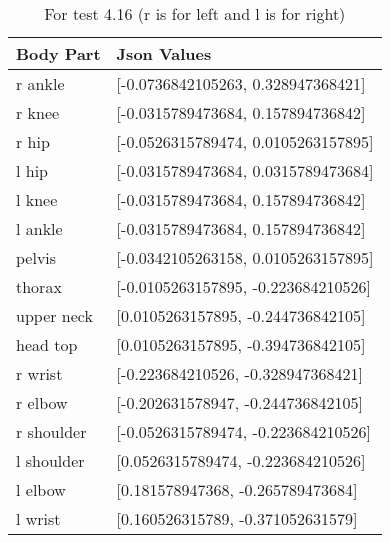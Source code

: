 \documentclass{scrreprt}
\begin{document}
\begin{table}[H]
    \centering
    \caption{For test 4.16 (r is for left and l is for right)}
    \begin{tabular}{||p{2cm}|p{6.5cm}||}
        \hline
        \textbf{Body Part} & \textbf {Json Values}\\
         \hline\hline
        r ankle & [-0.0736842105263, 0.328947368421] \\
        \hline
        r knee & [-0.0315789473684, 0.157894736842] \\
        \hline
        r hip & [-0.0526315789474, 0.0105263157895] \\
        \hline
        l hip & [-0.0315789473684, 0.0315789473684] \\
        \hline
        l knee & [-0.0315789473684, 0.157894736842] \\
        \hline
        l ankle & [-0.0315789473684, 0.157894736842] \\
        \hline
        pelvis & [-0.0342105263158, 0.0105263157895]\\
        \hline
        thorax & [-0.0105263157895, -0.223684210526] \\
        \hline
        upper neck & [0.0105263157895, -0.244736842105] \\
        \hline
        head top & [0.0105263157895, -0.394736842105] \\
        \hline
        r wrist & [-0.223684210526, -0.328947368421] \\
        \hline
        r elbow & [-0.202631578947, -0.244736842105] \\
        \hline
        r shoulder & [-0.0526315789474, -0.223684210526] \\
        \hline
        l shoulder & [0.0526315789474, -0.223684210526] \\
        \hline
        l elbow & [0.181578947368, -0.265789473684] \\
        \hline
        l wrist & [0.160526315789, -0.371052631579] \\
        \hline
    \end{tabular}
\end{table}
\end{document}
